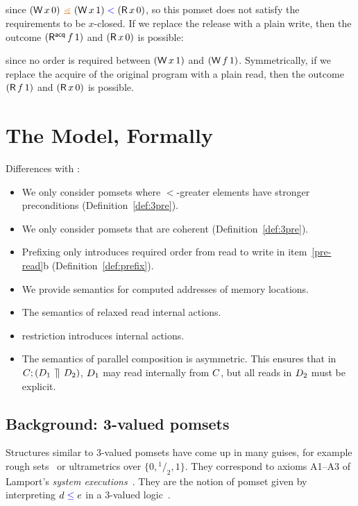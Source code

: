 since $(\DW x0) \gtN (\DW x1) \lt (\DR x0)$, so this pomset does not satisfy the
requirements to be $x$-closed.
If we replace the release
with a plain write, then the outcome $(\DRAcq f1)$ and $(\DR x0)$ is possible:
\begin{tikzdisplay}[node distance=1em]
\end{tikzdisplay}
since no order is required between $(\DW x1)$ and $(\DW f1)$.  
Symmetrically, if we replace the acquire of the original program
with a plain read, then the outcome $(\DR f1)$ and $(\DR x0)$ is possible.

\section{The Model,  Formally}
\label{sec:model}

Differences with \cite{2019-sp}:
\begin{itemize}
\item We only consider pomsets where $\lt$-greater elements have stronger
  preconditions (Definition~\ref{def:3pre}).
\item We only consider pomsets that are coherent (Definition~\ref{def:3pre}).
\item Prefixing only introduces required order from read to write in item~\ref{pre-read}b (Definition~\ref{def:prefix}).
\item We provide semantics for computed addresses of memory locations.
\item The semantics of relaxed read internal actions.
\item restriction introduces internal actions.
\item The semantics of parallel composition is asymmetric.  This ensures that
  in $C;(D_1\,\mathbin{\rrceil}\,D_2)$, $D_1$ may read internally from $C$,
  but all reads in $D_2$ must be explicit.
\end{itemize}


\subsection{Background: 3-valued pomsets}
\label{sec:pomsets}

Structures similar to 3-valued pomsets have come up in many guises, for example
rough sets~\cite{Pawlak1982} or ultrametrics over
$\{0,{}^1\!/_2,1\}$. They correspond to axioms A1--A3 of Lamport's
\emph{system executions}~\cite{DBLP:journals/dc/Lamport86}.
They are the notion of pomset given by interpreting
$d\mathrel{{\color{blue}\leq}}e$ in a 3-valued logic~\cite{Urquhart1986}. 




